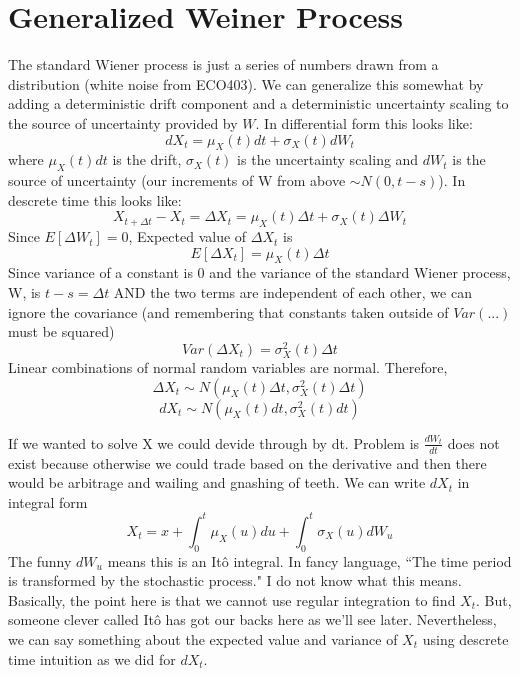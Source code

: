 
\section{Generalized Weiner Process}

The standard Wiener process is just a series of numbers drawn from a
distribution (white noise from ECO403). We can generalize this somewhat by
adding a deterministic drift component and a deterministic uncertainty scaling
to the source of uncertainty provided by $W$. In differential form this looks
like:
\begin{equation} \label{dGenW}
    dX_t=\mu_X(t)dt+\sigma_X(t)dW_t
\end{equation}
where $\mu_X(t)dt$ is the drift, $\sigma_X(t)$ is the uncertainty scaling and
$dW_t$ is the source of uncertainty (our increments of W from above
$\sim N(0, t-s)$).
In descrete time this looks like:
\begin{equation}
    X_{t+\Delta t}-X_t=\Delta X_t=\mu_X(t)\Delta t+\sigma_X(t)\Delta W_t
\end{equation}
Since $E[\Delta W_t]=0$, Expected value of $\Delta X_t$ is
\begin{equation} \label{ExpDesGenW}
    E[\Delta X_t]=\mu_X(t)\Delta t
\end{equation}
Since variance of a constant is 0 and the variance of the standard Wiener
process, W, is $t-s=\Delta t$ AND the two terms are independent of each other,
we can ignore the covariance (and remembering that constants taken outside of
$Var(...)$ must be squared)
\begin{equation} \label{VarDesGenW}
    Var(\Delta X_t)=\sigma^2_X(t)\Delta t
\end{equation}
Linear combinations of normal random variables are normal. Therefore,
\begin{equation}
    \Delta X_t \sim N(\mu_X(t)\Delta t, \sigma^2_X(t)\Delta t)
\end{equation}
\begin{equation}
    dX_t \sim N(\mu_X(t)dt, \sigma^2_X(t)dt)
\end{equation}

If we wanted to solve X we could devide through by dt. Problem is
$\frac{dW_t}{dt}$ does not exist because otherwise we could trade based on the
derivative and then there would be arbitrage and wailing and gnashing of teeth.
We can write $dX_t$ in integral form
\begin{equation} \label{GenW}
    X_t=x+\int_0^t\mu_X(u)du+\int_0^t\sigma_X(u)dW_u
\end{equation}
The funny $dW_u$ means this is an It\^o integral. In fancy language, ``The time
period is transformed by the stochastic process." I do not know what this
means. Basically, the point here is that we cannot use regular integration to
find $X_t$. But, someone clever called It\^o has got our backs here as we'll
see later. Nevertheless, we can say something about the expected value and
variance of $X_t$ using descrete time intuition as we did for $dX_t$.

